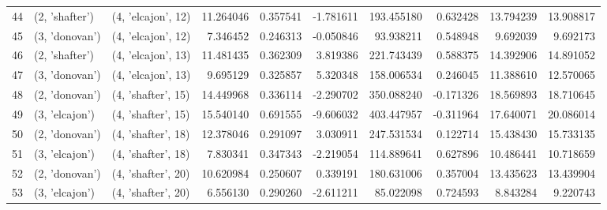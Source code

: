 \begin{tabular}{lllrrrrrrr}
44 &   (2, 'shafter') &  (4, 'elcajon', 12) &  11.264046 &  0.357541 &  -1.781611 &   193.455180 &  0.632428 &  13.794239 &  13.908817 \\
45 &   (3, 'donovan') &  (4, 'elcajon', 12) &   7.346452 &  0.246313 &  -0.050846 &    93.938211 &  0.548948 &   9.692039 &   9.692173 \\
46 &   (2, 'shafter') &  (4, 'elcajon', 13) &  11.481435 &  0.362309 &   3.819386 &   221.743439 &  0.588375 &  14.392906 &  14.891052 \\
47 &   (3, 'donovan') &  (4, 'elcajon', 13) &   9.695129 &  0.325857 &   5.320348 &   158.006534 &  0.246045 &  11.388610 &  12.570065 \\
48 &   (2, 'donovan') &  (4, 'shafter', 15) &  14.449968 &  0.336114 &  -2.290702 &   350.088240 & -0.171326 &  18.569893 &  18.710645 \\
49 &   (3, 'elcajon') &  (4, 'shafter', 15) &  15.540140 &  0.691555 &  -9.606032 &   403.447957 & -0.311964 &  17.640071 &  20.086014 \\
50 &   (2, 'donovan') &  (4, 'shafter', 18) &  12.378046 &  0.291097 &   3.030911 &   247.531534 &  0.122714 &  15.438430 &  15.733135 \\
51 &   (3, 'elcajon') &  (4, 'shafter', 18) &   7.830341 &  0.347343 &  -2.219054 &   114.889641 &  0.627896 &  10.486441 &  10.718659 \\
52 &   (2, 'donovan') &  (4, 'shafter', 20) &  10.620984 &  0.250607 &   0.339191 &   180.631006 &  0.357004 &  13.435623 &  13.439904 \\
53 &   (3, 'elcajon') &  (4, 'shafter', 20) &   6.556130 &  0.290260 &  -2.611211 &    85.022098 &  0.724593 &   8.843284 &   9.220743 \\
\bottomrule
\end{tabular}
